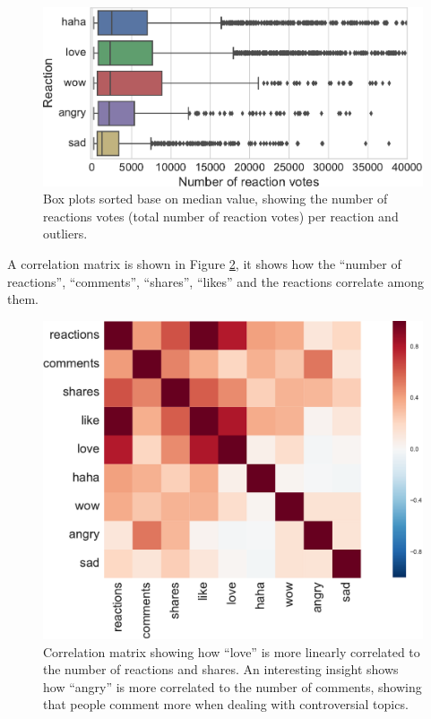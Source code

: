 \documentclass[9pt]{article}
\begin{document}
\begin{figure}[ht!]
\centering
\includegraphics[width=1.0\columnwidth]{../3_notebooks/notebook_figures/boxplots_fblike_reactions.pdf}
\caption{Box plots sorted base on median value, showing the number of reactions votes (total number of reaction votes) per reaction and outliers. }
\label{fig:boxplot}
\end{figure}

A correlation matrix is shown in Figure \ref{fig:corr}, it shows how the ``number of reactions'', ``comments'', ``shares'', ``likes'' and the reactions correlate among them.

\begin{figure}[ht!]
\centering
\includegraphics[width=1.0\columnwidth]{../3_notebooks/notebook_figures/corr_mat.pdf}
\caption{Correlation matrix showing how ``love'' is more linearly correlated to the number of reactions and shares. An interesting insight shows how ``angry'' is more correlated to the number of comments, showing that people comment more when dealing with controversial topics.}
\label{fig:corr}
\end{figure}
\end{document}
